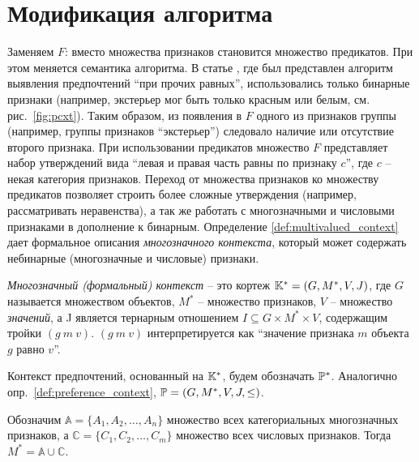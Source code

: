 \chapter{Модификация алгоритма}
\label{chapter:modification}



Заменяем $F$: вместо множества признаков становится множество предикатов. При этом меняется семантика алгоритма. В статье \cite{Obiedkov:2013}, где был представлен алгоритм выявления предпочтений \enquote{при прочих равных}, использовались только бинарные признаки (например, экстерьер мог быть только красным или белым, см. рис.~\ref{fig:pcxt}). Таким образом, из появления в $F$ одного из признаков группы (например, группы признаков ``экстерьер'') следовало наличие или отсутствие второго признака. При использовании предикатов множество $F$ представляет набор утверждений вида ``левая и правая часть равны по признаку $c$'', где $c$ – некая категория признаков. Переход от множества признаков ко множеству предикатов позволяет строить более сложные утверждения (например, рассматривать неравенства), а так же работать с многозначными и числовыми признаками в дополнение к бинарным. Определение \ref{def:multivalued_context}\cite{Ganter:1997} дает формальное описания \emph{многозначного контекста}, который может содержать небинарные (многозначные и числовые) признаки.

\begin{definition}
\label{def:multivalued_context}
	\emph{Многозначный (формальный) контекст} – это кортеж $\mathbb{K}^* = (G, M^*, V, J)$, где $G$ называется множеством объектов, $M^*$ – множество признаков, $V$ – множество \emph{значений}, а J является тернарным отношением ${I \subseteq G \times M^* \times V}$, содержащим тройки $(g\:m\:v)$. $(g\:m\:v)$ интерпретируется как ``значение признака $m$ объекта $g$ равно $v$''. 
\end{definition}

Контекст предпочтений, основанный на $\mathbb{K}^*$, будем обозначать $\mathbb{P}^*$. Аналогично опр.~\ref{def:preference_context}, $\mathbb{P} = (G, M^*, V, J, \leq)$.

Обозначим $\mathbb{A} = \{A_1, A_2, \dots, A_n\}$ множество всех категориальных многозначных признаков, а $\mathbb{C} = \{C_1, C_2, \dots, C_m\}$ множество всех числовых признаков. Тогда $M^* = \mathbb{A} \cup \mathbb{C}$.

